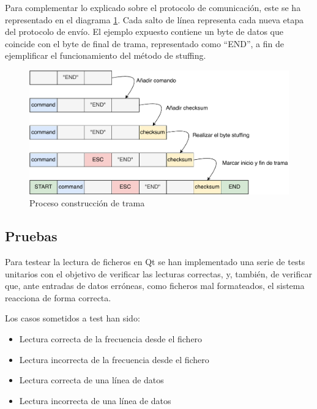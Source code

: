         Para complementar lo explicado sobre el protocolo de comunicación, este se ha representado en el diagrama \ref{fig:frame}. Cada salto de línea representa cada nueva etapa del protocolo de envío. El ejemplo expuesto contiene un byte de datos que coincide con el byte de final de trama, representado como “END”, a fin de ejemplificar el funcionamiento del método de stuffing.

        \begin{figure}[H]
                \centering
                        \includegraphics[width = \linewidth]{figuras/ProtocoloCom.pdf}
                \caption{Proceso construcción de trama}
                \label{fig:frame}
        \end{figure}

    \subsection{Pruebas}

        Para testear la lectura de ficheros en Qt se han implementado una serie de tests unitarios con el objetivo de verificar las lecturas correctas, y, también, de verificar que, ante entradas de datos erróneas, como ficheros mal formateados, el sistema reacciona de forma correcta.

        Los casos sometidos a test han sido:

        \begin{itemize}
                \item Lectura correcta de la frecuencia desde el fichero
                \item Lectura incorrecta de la frecuencia desde el fichero
                \item Lectura correcta de una línea de datos
                \item Lectura incorrecta de una línea de datos
        \end{itemize}

